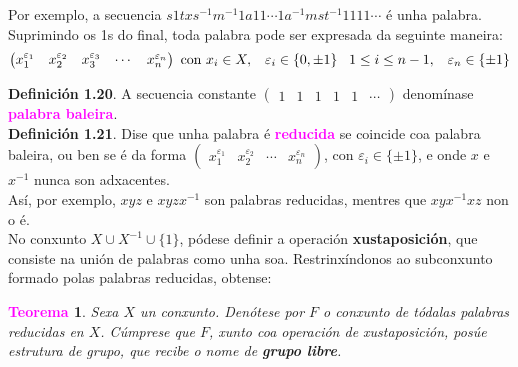 \documentclass[twoside]{report}
\newcommand{\magbf}[1]{\textcolor{magenta}{\textbf{#1}}} %
\theoremstyle{mystyle}
\newtheorem{theo}{\magbf{Teorema}}[chapter]
\newenvironment{theorem}
{\begin{mdframed}[linecolor = magenta,backgroundcolor = classicrose, linewidth = 2mm]\begin{theo}}
{\end{theo}\end{mdframed}}
\begin{document}
\vspace{2mm}

\noindent Por exemplo, a secuencia $s1txs^{-1}m^{-1}1a11 \cdots 1a^{-1}mst^{-1}1111 \cdots$ é unha palabra.\\

\noindent Suprimindo os 1s do final, toda palabra pode ser expresada da seguinte maneira:
$$\begin{pmatrix}
x_{1}^{\varepsilon_{1}} & x_{2}^{\varepsilon_{2}} & x_{3}^{\varepsilon_{3}} & \cdots & x_{n}^{\varepsilon_{n}}
\end{pmatrix}
\text{    con } x_{i} \in X ,\hspace{3mm} \varepsilon_{i} \in \{0, \pm1\} \hspace{3mm} 1 \leq i \leq n-1 ,\hspace{3mm} \varepsilon_{n} \in \{\pm1\}
$$

\noindent \textbf{Definición 1.20}. A secuencia constante $\begin{pmatrix} 1 & 1 & 1 & 1 & 1 & \cdots \end{pmatrix}$ denomínase \magbf{palabra baleira}.\\

\noindent \textbf{Definición 1.21}. Dise que unha palabra é \magbf{reducida} se coincide coa palabra baleira, ou ben se é da forma $\begin{pmatrix} x_{1}^{\varepsilon_{1}} & x_{2}^{\varepsilon_{2}} & \cdots & x_{n}^{\varepsilon_{n}}\end{pmatrix}$, con $\varepsilon_{i} \in \{\pm1\}$, e onde $x$ e $x^{-1}$ nunca son adxacentes. \\

\noindent Así, por exemplo, $xyz$ e $xyzx^{-1}$ son palabras reducidas, mentres que $xyx^{-1}xz$ non o é.\\

\noindent No conxunto $X \cup X^{-1} \cup \{1\}$, pódese definir a operación \textbf{xustaposición}, que consiste na unión de palabras como unha soa. Restrinxíndonos ao subconxunto formado polas palabras reducidas, obtense: \\

\begin{theorem} \label{th1.10}
Sexa $X$ un conxunto. Denótese por $F$ o conxunto de tódalas palabras reducidas en $X$. Cúmprese que $F$, xunto coa operación de xustaposición, posúe estrutura de grupo, que recibe o nome de \textbf{grupo libre}.
\end{theorem}

\vspace{2mm}
\end{document}
